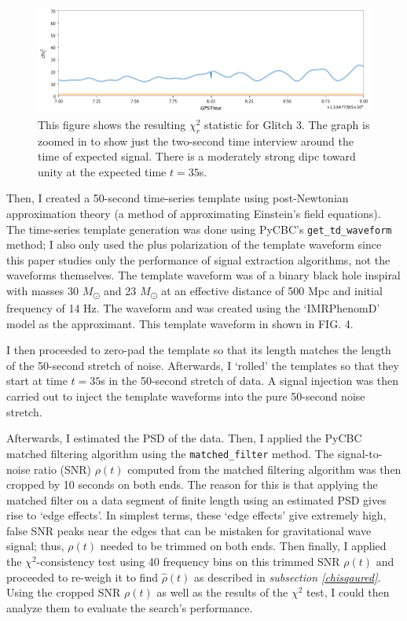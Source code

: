 \documentclass[preprint,
letterpaper,
 amsmath,amssymb,
 aps,
]{revtex4-2}
\def\code#1{\texttt{#1}}
\begin{document}
\begin{figure}[t]
\includegraphics[width = .9\textwidth]{chi2 glitch 3.png}
\caption{This figure shows the resulting $\chi^2_r$ statistic for Glitch 3. The graph is zoomed in to show just the two-second time interview around the time of expected signal. There is a moderately strong dipc toward unity at the expected time $t=35$s.}
\centering
\end{figure} 

Then, I created a 50-second time-series template using post-Newtonian approximation theory (a method of approximating Einstein's field equations). The time-series template generation was done using PyCBC's \code{get\_td\_waveform} method; I also only used the plus polarization of the template waveform since this paper studies only the performance of signal extraction algorithms, not the waveforms themselves. The template waveform was of a binary black hole inspiral with masses 30 $M$\textsubscript{\(\odot\)} and 23 $M$\textsubscript{\(\odot\)} at an effective distance of 500 Mpc and initial frequency of 14 Hz. The waveform and was created using the `IMRPhenomD' model as the approximant. This template waveform in shown in FIG. 4.


I then proceeded to zero-pad the template so that its length matches the length of the 50-second stretch of noise. Afterwards, I `rolled' the templates so that they start at time $t=35$s in the 50-second stretch of data. A signal injection was then carried out to inject the template waveforms into the pure 50-second noise stretch. 

Afterwards, I estimated the PSD of the data. Then, I applied the PyCBC matched filtering algorithm using the \code{matched\_filter} method. The signal-to-noise ratio (SNR) $\rho (t)$ computed from the matched filtering algorithm was then cropped by 10 seconds on both ends. The reason for this is that applying the matched filter on a data segment of finite length using an estimated PSD gives rise to `edge effects'. In simplest terms, these `edge effects' give extremely high, false SNR peaks near the edges that can be mistaken for gravitational wave signal; thus, $\rho(t)$ needed to be trimmed on both ends. Then finally, I applied the $\chi^2$-consistency test using 40 frequency bins on this trimmed SNR $\rho(t)$ and proceeded to re-weigh it to find $\hat{\rho}(t)$ as described in \textit{subsection \ref{chisqaured}}. Using the cropped SNR $\rho(t)$ as well as the results of the $\chi^2$ test, I could then analyze them to evaluate the search's performance. 
\end{document}
